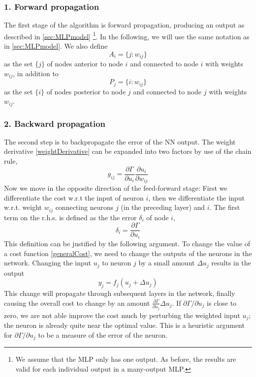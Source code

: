 \documentclass[twoside,english]{uiofysmaster}
\begin{document}
\subsubsection{1. Forward propagation}
The first stage of the algorithm is forward propagation, producing an output as described in \autoref{sec:MLPmodel}%
\footnote{We assume that the MLP only has one output. As before, the results are valid for each individual output in 
a many-output MLP.}.
In the following, we will use the same notation as in \autoref{sec:MLPmodel}. We also define
\begin{equation}
 A_i = \{j:w_{ij}\}
\end{equation}
as the set $\{j\}$ of nodes anterior to node $i$ and connected to node $i$ with weights $w_{ij}$, in addition to
\begin{equation}
 P_j = \{i:w_{ij}\}
\end{equation}
as the set $\{i\}$ of nodes posterior to node $j$ and connected to node $j$ with weights $w_{ij}$. 

\subsubsection{2. Backward propagation}
The second step is to backpropagate the error of the NN output. The weight derivative \eqref{weightDerivative}
can be expanded into two factors by use of the chain rule,
\begin{equation}
 g_{ij} = \frac{\partial \Gamma}{\partial u_i}\frac{\partial u_i}{\partial w_{ij}}
 \label{weightDerivativeExpanded}
\end{equation}
Now we move in the opposite direction of the feed-forward stage: First we differentiate the cost w.r.t 
the input of neuron $i$, then we differentiate the input w.r.t. weight $w_{ij}$ connecting neurons $j$ (in the preceding layer)
and $i$. 
The first term on the r.h.s. is defined as the the error $\delta_i$ of node $i$, 
\begin{equation}
 \delta_i = \frac{\partial\Gamma}{\partial u_i}
 \label{neuronError}
\end{equation}
This definition can be justified by the following argument.
To change the value of a cost function \eqref{generalCost}, we need to change the outputs of the neurons in the network. 
Changing the input $u_j$ to neuron $j$ by a small amount $\Delta u_j$ results in the output
\begin{equation}
 y_j = f_j(u_j + \Delta u_j)
\end{equation}
This change will propagate through subsequent layers in the network, finally causing the overall cost to change
by an amount $\frac{\partial \Gamma}{\partial u_j}\Delta u_j$. If $\partial \Gamma / \partial u_j$ is close to zero,
we are not able improve the cost much by perturbing the weighted input $u_j$; the neuron is already quite near the optimal value.
This is a heuristic argument for $\partial \Gamma / \partial u_j$ to be a measure of the error of the neuron. 
\end{document}
